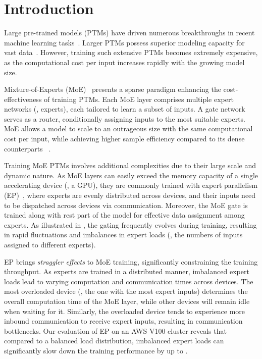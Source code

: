 \section{Introduction}\label{sec:intro}

Large pre-trained models (PTMs) have driven numerous breakthroughs in recent machine learning tasks~\cite{floridi2020gpt,alexey2020vit,liu2021swin}.
Larger PTMs possess superior modeling capacity for vast data~\cite{kaplan2020scaling,hoffmann2022chinchilla}.
However, training such extensive PTMs becomes extremely expensive, as the computational cost per input increases rapidly with the growing model size.

Mixture-of-Experts (MoE)~\cite{jacobs1991adaptive, shazeer2017outrageously} presents a sparse paradigm enhancing the cost-effectiveness of training PTMs.
Each MoE layer comprises multiple expert networks (\ie, experts), each tailored to learn a subset of inputs. 
A gate network serves as a router, conditionally assigning inputs to the most suitable experts.
MoE allows a model to scale to an outrageous size with the same computational cost per input, while achieving higher sample efficiency compared to its dense counterparts
~\cite{du2022glam, riquelme2021vmoe, fedus2022switch}.

Training MoE PTMs involves additional complexities due to their large scale and dynamic nature.
As MoE layers can easily exceed the memory capacity of a single accelerating device (\eg, a GPU), they are commonly trained with expert parallelism (EP)~\cite{shazeer2017outrageously},
where experts are evenly distributed across devices, and their inputs need to be dispatched across devices via \collatoa communication.
Moreover, the MoE gate is trained along with rest part of the model for effective data assignment among experts. 
As illustrated in , the gating frequently evolves during training,
resulting in rapid fluctuations and imbalances in expert loads (\ie, the numbers of inputs assigned to different experts).



EP brings \textit{straggler effects} to MoE training, significantly constraining the training throughput. As experts are trained in a distributed manner, imbalanced expert loads lead to varying computation and communication times across devices.
The most overloaded device (\ie, the one with the most expert inputs) determines the overall computation time of the MoE layer, while other devices will remain idle when waiting for it.
Similarly, the overloaded device tends to experience more inbound communication 
to receive expert inputs, resulting in communication bottlenecks.
Our evaluation of EP on an AWS V100 cluster reveals that compared to a balanced load distribution, imbalanced expert loads can significantly slow down the training performance by up to \imbalanceSlowdown.

